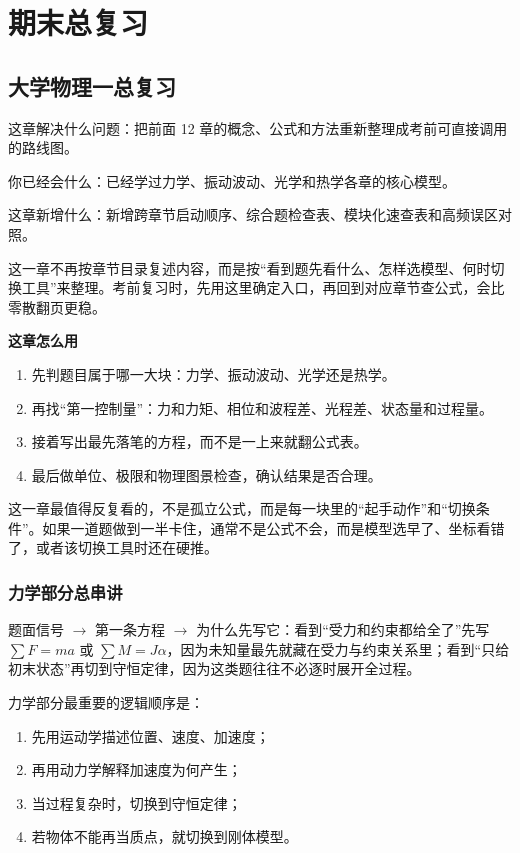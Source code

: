 \documentclass[lang=cn,11pt]{elegantbook}
\newcommand{\bridge}[1]{\begin{note}#1\end{note}}
\newcommand{\chapterroadmap}[3]{%
\begin{introduction}
  \item {\heiti 这章解决什么问题：}#1
  \item {\heiti 你已经会什么：}#2
  \item {\heiti 这章新增什么：}#3
\end{introduction}}
\begin{document}
\part{期末总复习}

\chapter{大学物理一总复习}

\chapterroadmap
{把前面 12 章的概念、公式和方法重新整理成考前可直接调用的路线图。}
{已经学过力学、振动波动、光学和热学各章的核心模型。}
{新增跨章节启动顺序、综合题检查表、模块化速查表和高频误区对照。}

\bridge{这一章不再按章节目录复述内容，而是按“看到题先看什么、怎样选模型、何时切换工具”来整理。考前复习时，先用这里确定入口，再回到对应章节查公式，会比零散翻页更稳。}

\textbf{这章怎么用}

\begin{enumerate}
  \item 先判题目属于哪一大块：力学、振动波动、光学还是热学。
  \item 再找“第一控制量”：力和力矩、相位和波程差、光程差、状态量和过程量。
  \item 接着写出最先落笔的方程，而不是一上来就翻公式表。
  \item 最后做单位、极限和物理图景检查，确认结果是否合理。
\end{enumerate}

\begin{remark}
这一章最值得反复看的，不是孤立公式，而是每一块里的“起手动作”和“切换条件”。如果一道题做到一半卡住，通常不是公式不会，而是模型选早了、坐标看错了，或者该切换工具时还在硬推。
\end{remark}

\section{力学部分总串讲}

\bridge{题面信号 \(\rightarrow\) 第一条方程 \(\rightarrow\) 为什么先写它：看到“受力和约束都给全了”先写 \(\sum F=ma\) 或 \(\sum M=J\alpha\)，因为未知量最先就藏在受力与约束关系里；看到“只给初末状态”再切到守恒定律，因为这类题往往不必逐时展开全过程。}

力学部分最重要的逻辑顺序是：
\begin{enumerate}
  \item 先用运动学描述位置、速度、加速度；
  \item 再用动力学解释加速度为何产生；
  \item 当过程复杂时，切换到守恒定律；
  \item 若物体不能再当质点，就切换到刚体模型。
\end{enumerate}
\end{document}
